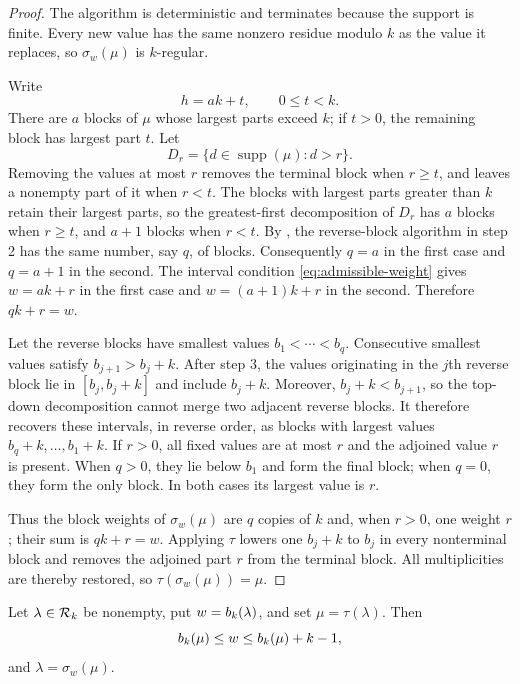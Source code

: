 \begin{proof}
The algorithm is deterministic and terminates because the support is finite.
Every new value has the same nonzero residue modulo $k$ as the value it
replaces, so $\sigma_w(\mu)$ is $k$-regular.

Write
\begin{equation}\label{eq:decompose-h}
 h=ak+t,\qquad 0\leq t<k.
\end{equation}
There are $a$ blocks of $\mu$ whose largest parts exceed $k$; if $t>0$, the
remaining block has largest part $t$. Let
\[
 D_r=\{d\in\operatorname{supp}(\mu):d>r\}.
\]
Removing the values at most $r$ removes the terminal block when $r\geq t$,
and leaves a nonempty part of it when $r<t$. The blocks with largest parts
greater than $k$ retain their largest parts, so the greatest-first
decomposition of $D_r$ has $a$ blocks when $r\geq t$, and $a+1$ blocks when
$r<t$. By , the reverse-block algorithm in step 2
has the same number, say $q$, of blocks. Consequently $q=a$ in the first
case and $q=a+1$ in the second. The interval condition
\eqref{eq:admissible-weight} gives $w=ak+r$ in the first case and
$w=(a+1)k+r$ in the second. Therefore $qk+r=w$.

Let the reverse blocks have smallest values $b_1<\cdots<b_q$. Consecutive
smallest values satisfy $b_{j+1}>b_j+k$. After step 3, the values originating
in the $j$th reverse block lie in $[b_j,b_j+k]$ and include $b_j+k$.
Moreover, $b_j+k<b_{j+1}$, so the top-down decomposition cannot merge two
adjacent reverse blocks. It therefore recovers these intervals, in reverse
order, as blocks with largest values $b_q+k,\ldots,b_1+k$. If $r>0$, all
fixed values are at most $r$ and the adjoined value $r$ is present. When
$q>0$, they lie below $b_1$ and form the final block; when $q=0$, they form
the only block. In both cases its largest value is $r$.

Thus the block weights of $\sigma_w(\mu)$ are $q$ copies of $k$ and, when
$r>0$, one weight $r$; their sum is $qk+r=w$. Applying $\tau$ lowers one
$b_j+k$ to $b_j$ in every nonterminal block and removes the adjoined part
$r$ from the terminal block. All multiplicities are thereby restored, so
$\tau(\sigma_w(\mu))=\mu$.
\end{proof}

\begin{lemma}
\label{lem:converse-transfer}
Let $\lambda\in\mathcal{R}_k$ be nonempty, put $w=b_k(\lambda)$, and set
$\mu=\tau(\lambda)$. Then
\begin{equation}\label{eq:block-drop}
 b_k(\mu)\leq w\leq b_k(\mu)+k-1,
\end{equation}
and $\lambda=\sigma_w(\mu)$.
\end{lemma}


